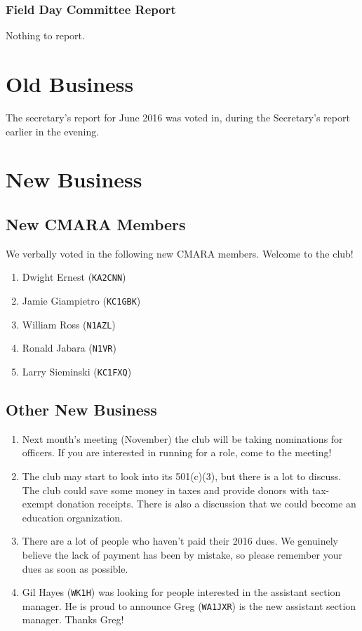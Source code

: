 \documentclass[10pt,letterpaper]{article}
\begin{document}
\subsubsection{Field Day Committee Report}

Nothing to report.

\section{Old Business}

The secretary's report for June 2016 was voted in, during the Secretary's report earlier in the evening.

\section{New Business}

\subsection{New CMARA Members}

We verbally voted in the following new CMARA members. Welcome to the club!
\begin{enumerate}
\item Dwight Ernest (\texttt{KA2CNN})
\item Jamie Giampietro (\texttt{KC1GBK})
\item William Ross (\texttt{N1AZL})
\item Ronald Jabara (\texttt{N1VR})
\item Larry Sieminski (\texttt{KC1FXQ})

\end{enumerate}

\subsection{Other New Business}

\begin{enumerate}
\item Next month's meeting (November) the club will be taking nominations for officers. If you are interested in running for a role, come to the meeting!
\item The club may start to look into its 501(c)(3), but there is a lot to discuss. The club could save some money in taxes and provide donors with tax-exempt donation receipts. There is also a discussion that we could become an education organization.
\item There are a lot of people who haven't paid their 2016 dues. We genuinely believe the lack of payment has been by mistake, so please remember your dues as soon as possible.
\item Gil Hayes (\texttt{WK1H}) was looking for people interested in the assistant section manager. He is proud to announce Greg (\texttt{WA1JXR}) is the new assistant section manager. Thanks Greg!
\end{enumerate}
\end{document}
